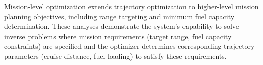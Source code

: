 Mission-level optimization extends trajectory optimization to higher-level mission planning objectives, including range targeting and minimum fuel capacity determination. These analyses demonstrate the system's capability to solve inverse problems where mission requirements (target range, fuel capacity constraints) are specified and the optimizer determines corresponding trajectory parameters (cruise distance, fuel loading) to satisfy these requirements.
